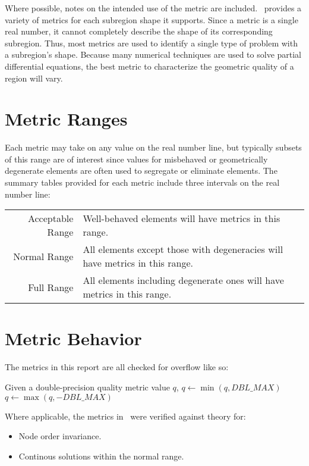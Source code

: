 Where possible, notes on the intended use of the metric are included.
\verd\ provides a variety of metrics for each subregion shape it supports.
Since a metric is a single real number, it cannot completely describe the shape of its corresponding subregion.
Thus, most metrics are used to identify a single type of problem with a subregion's shape.
Because many numerical techniques are used to solve partial differential equations,
the best metric to characterize the geometric quality of a region will vary.

\section{Metric Ranges\label{s:metric-range}}

Each metric may take on any value on the real number line, but typically subsets of this range
are of interest since values for misbehaved or geometrically degenerate elements are often used to
segregate or eliminate elements.
The summary tables provided for each metric include three intervals on the real number line:
\begin{center}
\begin{tabular}{r@{ : }p{3.2in}}\hline
Acceptable Range&Well-behaved elements will have metrics in this range.\\
Normal Range    &All elements except those with degeneracies will have metrics in this range.\\
Full Range      &All elements including degenerate ones will have metrics in this range.\\ \hline
\end{tabular}
\end{center}

\section{Metric Behavior}

The metrics in this report are all checked for overflow like so:
\begin{algorithmic}[1]
\STATE Given a double-precision quality metric value $q$,
\STATE $q\gets\min\left( q, DBL\_MAX \right)$
\ELSE
\STATE $q\gets\max\left( q, -DBL\_MAX \right)$
\ENDIF
\end{algorithmic}

Where applicable, the metrics in \verd\ were verified against theory for:
\begin{itemize}
\item Node order invariance.
\item Continous solutions within the normal range.
\end{itemize}
